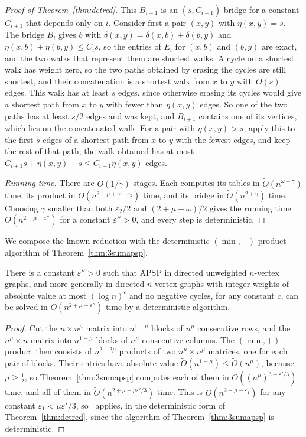 \begin{proof}[Proof of Theorem~\ref{thm:detred}]
This $B_{i+1}$ is an $(s,C_{i+1})$-bridge for a constant $C_{i+1}$ that depends only on $i$. Consider first a pair $(x,y)$ with $\eta(x,y)=s$. The bridge $B_i$ gives $b$ with $\delta(x,y)=\delta(x,b)+\delta(b,y)$ and $\eta(x,b)+\eta(b,y)\le C_is$, so the entries of $E_i$ for $(x,b)$ and $(b,y)$ are exact, and the two walks that represent them are shortest walks. A cycle on a shortest walk has weight zero, so the two paths obtained by erasing the cycles are still shortest, and their concatenation is a shortest walk from $x$ to $y$ with $O(s)$ edges. This walk has at least $s$ edges, since otherwise erasing its cycles would give a shortest path from $x$ to $y$ with fewer than $\eta(x,y)$ edges. So one of the two paths has at least $s/2$ edges and was kept, and $B_{i+1}$ contains one of its vertices, which lies on the concatenated walk. For a pair with $\eta(x,y)>s$, apply this to the first $s$ edges of a shortest path from $x$ to $y$ with the fewest edges, and keep the rest of that path; the walk obtained has at most $C_{i+1}s+\eta(x,y)-s\le C_{i+1}\eta(x,y)$ edges.

\emph{Running time.} There are $O(1/\gamma)$ stages. Each computes its tables in $\tilde O(n^{\omega+\gamma})$ time, its product in $O(n^{2+\mu+\gamma-\varepsilon_2})$ time, and its bridge in $\tilde O(n^{2+\gamma})$ time. Choosing $\gamma$ smaller than both $\varepsilon_2/2$ and $(2+\mu-\omega)/2$ gives the running time $O(n^{2+\mu-\varepsilon''})$ for a constant $\varepsilon''>0$, and every step is deterministic.
\end{proof}



We compose the known reduction with the deterministic $(\min,+)$-product algorithm of Theorem~\ref{thm:3sumapsp}.

\begin{theorem}\label{thm:dirapsp}
There is a constant $\varepsilon''>0$ such that APSP in directed unweighted $n$-vertex graphs, and more generally in directed $n$-vertex graphs with integer weights of absolute value at most $(\log n)^c$ and no negative cycles, for any constant $c$, can be solved in $O(n^{2+\mu-\varepsilon''})$ time by a deterministic algorithm.
\end{theorem}
\begin{proof}
Cut the $n\times n^{\mu}$ matrix into $n^{1-\mu}$ blocks of $n^{\mu}$ consecutive rows, and the $n^{\mu}\times n$ matrix into $n^{1-\mu}$ blocks of $n^{\mu}$ consecutive columns. The $(\min,+)$-product then consists of $n^{2-2\mu}$ products of two $n^{\mu}\times n^{\mu}$ matrices, one for each pair of blocks. Their entries have absolute value $\tilde{O}(n^{1-\mu})\leq\tilde{O}(n^{\mu})$, because $\mu\ge\frac12$, so Theorem~\ref{thm:3sumapsp} computes each of them in $\tilde{O}((n^{\mu})^{3-\varepsilon'/3})$ time, and all of them in $\tilde{O}(n^{2+\mu-\mu\varepsilon'/3})$ time. This is $O(n^{2+\mu-\varepsilon_1})$ for any constant $\varepsilon_1<\mu\varepsilon'/3$, so~\cite[Theorem~3.1]{CVX21} applies, in the deterministic form of Theorem~\ref{thm:detred}, since the algorithm of Theorem~\ref{thm:3sumapsp} is deterministic.
\end{proof}

